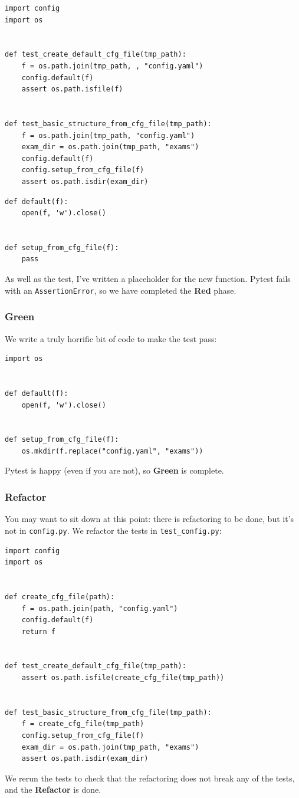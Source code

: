 \documentclass[10pt]{article}
\begin{document}
\begin{lstlisting}
import config
import os


def test_create_default_cfg_file(tmp_path):
    f = os.path.join(tmp_path, , "config.yaml")
    config.default(f)
    assert os.path.isfile(f)
    
    
def test_basic_structure_from_cfg_file(tmp_path):
    f = os.path.join(tmp_path, "config.yaml")
    exam_dir = os.path.join(tmp_path, "exams")
    config.default(f)
    config.setup_from_cfg_file(f)
    assert os.path.isdir(exam_dir)
\end{lstlisting}

\begin{lstlisting}
def default(f):
    open(f, 'w').close()


def setup_from_cfg_file(f):
    pass
\end{lstlisting}
As well as the test, I've written a placeholder for the new function. Pytest fails with an \texttt{AssertionError}, so we have completed the \textbf{Red} phase.

\subsubsection{Green}
We write a truly horrific bit of code to make the test pass:
\begin{lstlisting}
import os


def default(f):
    open(f, 'w').close()


def setup_from_cfg_file(f):
    os.mkdir(f.replace("config.yaml", "exams"))
\end{lstlisting}
Pytest is happy (even if you are not), so \textbf{Green} is complete.

\subsubsection{Refactor}
You may want to sit down at this point: there is refactoring to be done, but it's not in \texttt{config.py}. We refactor the tests in \texttt{test\_config.py}:
\begin{lstlisting}
import config
import os


def create_cfg_file(path):
    f = os.path.join(path, "config.yaml")
    config.default(f)
    return f


def test_create_default_cfg_file(tmp_path):
    assert os.path.isfile(create_cfg_file(tmp_path))


def test_basic_structure_from_cfg_file(tmp_path):
    f = create_cfg_file(tmp_path)
    config.setup_from_cfg_file(f)
    exam_dir = os.path.join(tmp_path, "exams")
    assert os.path.isdir(exam_dir)
\end{lstlisting}
We rerun the tests to check that the refactoring does not break any of the tests, and the \textbf{Refactor} is done.
\end{document}

